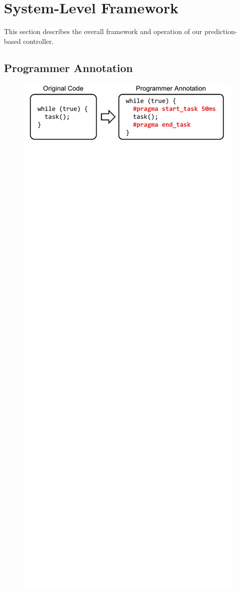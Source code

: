 \section{System-Level Framework}
\label{sec:exec_time_prediction.system}

This section describes the overall framework and operation of our
prediction-based controller.

\subsection{Programmer Annotation}

\begin{figure}
  \begin{center}
    \includegraphics{exec_time_prediction/figs/programmer_annotation.pdf}

\end{center}
\end{figure}
